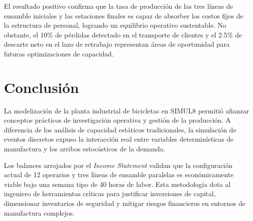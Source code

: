 \documentclass[runningheads]{llncs}
\begin{document}
El resultado positivo confirma que la tasa de producción de las tres líneas de ensamble iniciales y las estaciones finales es capaz de absorber los costos fijos de la estructura de personal, logrando un equilibrio operativo sustentable. No obstante, el 10\% de pérdidas detectado en el transporte de clientes y el 2.5\% de descarte neto en el lazo de retrabajo representan áreas de oportunidad para futuras optimizaciones de capacidad.

\section{Conclusión}
La modelización de la planta industrial de bicicletas en SIMUL8 permitió afianzar conceptos prácticos de investigación operativa y gestión de la producción. A diferencia de los análisis de capacidad estáticos tradicionales, la simulación de eventos discretos expuso la interacción real entre variables determinísticas de manufactura y los arribos estocásticos de la demanda. 

Los balances arrojados por el \textit{Income Statement} validan que la configuración actual de 12 operarios y tres líneas de ensamble paralelas es económicamente viable bajo una semana tipo de 40 horas de labor. Esta metodología dota al ingeniero de herramientas críticas para justificar inversiones de capital, dimensionar inventarios de seguridad y mitigar riesgos financieros en entornos de manufactura complejos.
\end{document}
